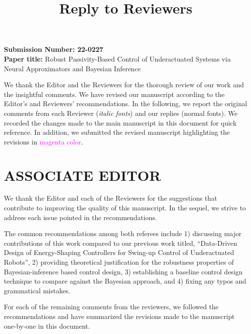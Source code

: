 \documentclass[11pt]{article}
\begin{document}
\title{Reply to Reviewers}
\maketitle

\noindent
\textbf{Submission Number: 22-0227}  \\%
\textbf{Paper title:} Robust Passivity-Based Control of Underactuated Systems via Neural Approximators and Bayesian Inference

\bigskip \bigskip \noindent 
%
We thank the Editor and the Reviewers for the thorough review of our work and
the insightful comments. We have revised our manuscript according to the
Editor's and Reviewers' recommendations. 
%
In the following, we report the
original comments from each Reviewer (\emph{italic fonts}) and our replies
(normal fonts). 
%
We recorded the changes made to the main manuscript in this
document for quick reference. 
%
In addition, we submitted the revised manuscript highlighting the revisions
in \textcolor{magenta}{magenta color}. 



\newpage
\section*{ASSOCIATE EDITOR}

\bigskip \bigskip

We thank the Editor and each of the Reviewers for the suggestions that
contribute to improving the quality of this manuscript. In the sequel, we strive
to address each issue pointed in the recommendations. 

\medskip

The common recommendations among both referees include 1) discussing major
contributions of this work compared to our previous work titled, ``Data-Driven
Design of Energy-Shaping Controllers for Swing-up Control of Underactuated
Robots'', 2) providing theoretical justification for the robustness properties of
Bayesian-inference based control design, 3) establishing a baseline control
design technique to compare against the Bayesian approach, and 4) fixing any
typos and grammatical mistakes.



%
%
For each of the remaining comments from the reviewers, we followed the
recommendations and have summarized the revisions made to the manuscript
one-by-one in this document.
\end{document}

